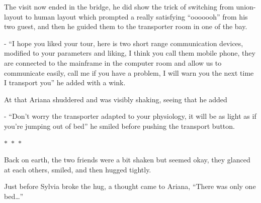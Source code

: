 \documentclass[hidelinks,12pt,a4paper]{book}
\newcommand\sep{\begin{center}
  $\ast$~$\ast$~$\ast$
\end{center}}
\begin{document}
The visit now ended in the bridge, he did show the trick of switching from union-layout to human layout which prompted 
a really satisfying “ooooooh” from his two guest, and then he guided them to the transporter room in one of the bay.\par
\bigskip

- “I hope you liked your tour, here is two short range communication devices, modified to your parameters and 
liking, I think you call them mobile phone, they are connected to the mainframe in the computer room and allow us 
to communicate easily, call me if you have a problem, I will warn you the next time I transport you” he added with a wink.\par
\bigskip

At that Ariana shuddered and was visibly shaking, seeing that he added\par
\bigskip

- “Don't worry the transporter adapted to your physiology, it will be as light as if you're jumping out of bed” 
he smiled before pushing the transport button.

\sep

Back on earth, the two friends were a bit shaken but seemed okay, they glanced at each others, smiled, and then 
hugged tightly.\par
\bigskip

Just before Sylvia broke the hug, a thought came to Ariana, “There was only one bed…”

\printglossaries
\end{document}
